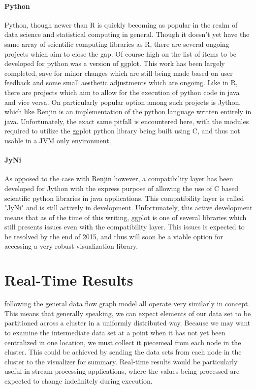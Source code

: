 \paragraph{Python}
Python, though newer than R is quickly becoming as popular in the realm of data science and statistical computing in general. Though it doesn't yet have the same array of scientific computing libraries as R, there are several ongoing projects which aim to close the gap. Of course high on the list of items to be developed for python was a version of ggplot. This work has been largely completed, save for minor changes which are still being made based on user feedback and some small aesthetic adjustments which are ongoing. Like in R, there are projects which aim to allow for the execution of python code in java and vice versa. On particularly popular option among such projects is Jython, which like Renjin is an implementation of the python language written entirely in java. Unfortunately, the exact same pitfall is encountered here, with the modules required to utilize the ggplot python library being built using C, and thus not usable in a JVM only environment. 

\paragraph{JyNi}
As opposed to the case with Renjin however, a compatibility layer has been developed for Jython with the express purpose of allowing the use of C based scientific python libraries in java applications. This compatibility layer is called "JyNi" \cite{Richthofer2013} and is still actively in development. Unfortunately, this active development means that as of the time of this writing, ggplot is one of several libraries which still presents issues even with the compatibility layer. This issues is expected to be resolved by the end of 2015, and thus will soon be a viable option for accessing a very robust visualization library.

\section{Real-Time Results}
\label{sec:realtime}
 following the general data flow graph model all operate very similarly in concept. This means that generally speaking, we can expect elements of our data set to be partitioned across a cluster in a uniformly distributed way. Because we may want to examine the intermediate data set at a point when it has not yet been centralized in one location, we must collect it piecemeal from each node in the cluster. This could be achieved by sending the data sets from each node in the cluster to the visualizer for summary. Real-time results would be particularly useful in stream processing applications, where the values being processed are expected to change indefinitely during execution.

